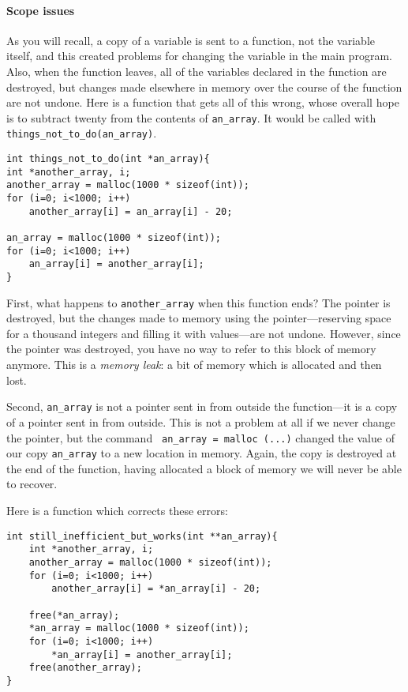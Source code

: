 \documentclass[12pt]{article}
\begin{document}
\paragraph{Scope issues} As you will recall, a copy of a variable is sent to a function, not the variable
itself, and this created problems for changing the variable in the main program. Also, when the function
leaves, all of the variables declared in the function are destroyed,
but changes made elsewhere in memory over the course of the function
are not undone. Here is a function that gets all of this wrong, whose overall hope is to subtract twenty
from the contents of {\tt an\_array}. It would be called with {\tt things\_not\_to\_do(an\_array)}.
\begin{verbatim}
int things_not_to_do(int *an_array){
int *another_array, i;
another_array = malloc(1000 * sizeof(int));
for (i=0; i<1000; i++)
    another_array[i] = an_array[i] - 20;

an_array = malloc(1000 * sizeof(int));
for (i=0; i<1000; i++)
    an_array[i] = another_array[i];
}
\end{verbatim}

First, what happens to {\tt another\_array} when this function
ends? The pointer is destroyed, but the changes made to memory using
the pointer---reserving space for a thousand integers and filling it
with values---are not undone. However, since the pointer was destroyed,
you have no way to refer to this block of memory anymore.  This is a
{\sl memory leak}: a bit of memory which is allocated and then lost.

Second, {\tt an\_array} is not a pointer sent in from outside the
function---it is a copy of a pointer sent in from outside. This is not
a problem at all if we never change the pointer, but the command {\tt
an\_array = malloc (...)} changed the value of our copy {\tt an\_array}
to a new location in memory.  Again, the copy is destroyed at the end
of the function, having allocated a block of memory we will never be
able to recover.

Here is a function which corrects these errors:

\begin{verbatim}
int still_inefficient_but_works(int **an_array){
    int *another_array, i;
    another_array = malloc(1000 * sizeof(int));
    for (i=0; i<1000; i++)
        another_array[i] = *an_array[i] - 20;

    free(*an_array);
    *an_array = malloc(1000 * sizeof(int));
    for (i=0; i<1000; i++)
        *an_array[i] = another_array[i];
    free(another_array);
}
\end{verbatim}
\end{document}
